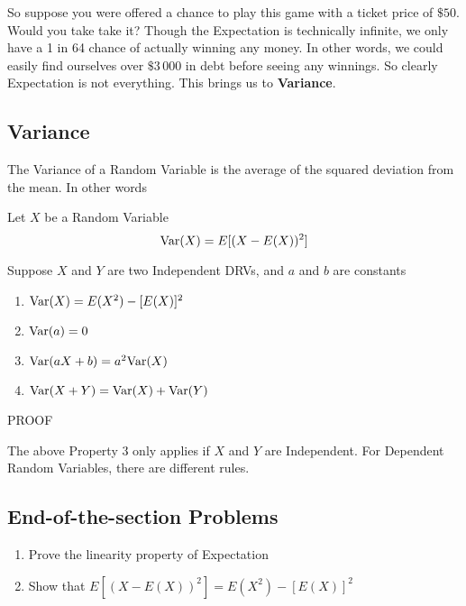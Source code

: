 So suppose you were offered a chance to play this game with a ticket price of $\$50$. Would you take take it? Though the Expectation is technically infinite, we only have a 1 in 64 chance of actually winning any money. In other words, we could easily find ourselves over $\$3\,000$ in debt before seeing any winnings.  So clearly Expectation is not everything. This brings us to \textbf{Variance}.

\subsection{Variance}
\newcommand{\Var}{\textup{Var}}
The Variance of a Random Variable is the average of the squared deviation from the mean. In other words
\begin{definition}
    Let $X$ be a Random Variable
    \[
        \Var(X)=E[(X-E(X))^2]   
    \]
\end{definition}


\begin{theorem}
    Suppose $X$ and $Y$ are two Independent DRVs, and $a$ and $b$ are constants
    \begin{enumerate}
        \item $\Var(X)=E(X^2)-[E(X)]^2$
        \item $\Var(a)=0$
        \item $\Var(aX+b)=a^2\Var(X)$
        \item $\Var(X+Y)=\Var(X)+\Var(Y)$
    \end{enumerate}
    \todo PROOF
\end{theorem}

\begin{notsofast}
    The above Property 3 only applies if $X$ and $Y$ are Independent. For Dependent Random Variables, there are different rules.
\end{notsofast}


\subsection{End-of-the-section Problems}
\begin{enumerate}
    \item Prove the linearity property of Expectation
    \item Show that $E[(X-E(X))^2]=E(X^2)-[E(X)]^2$
\end{enumerate}
